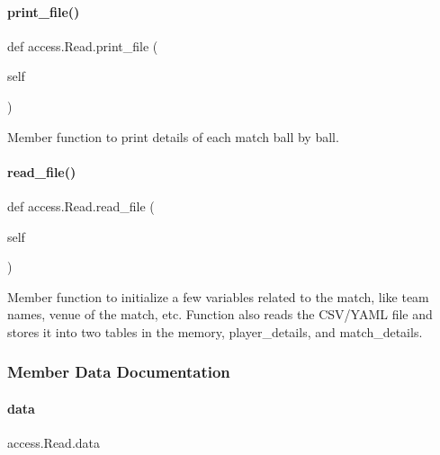 \paragraph{\texorpdfstring{print\+\_\+file()}{print\_file()}}
{\footnotesize\ttfamily def access.\+Read.\+print\+\_\+file (\begin{DoxyParamCaption}\item[{}]{self }\end{DoxyParamCaption})}

\begin{DoxyVerb}Member function to print details of each match ball by ball.
\end{DoxyVerb}
 \mbox{\label{classaccess_1_1Read_aeaf32257315cd5e6b99ce4bfef2d0bdb}} 
\paragraph{\texorpdfstring{read\+\_\+file()}{read\_file()}}
{\footnotesize\ttfamily def access.\+Read.\+read\+\_\+file (\begin{DoxyParamCaption}\item[{}]{self }\end{DoxyParamCaption})}

\begin{DoxyVerb}Member function to initialize a few variables related to the match, like team names, venue of the match, etc.
Function also reads the CSV/YAML file and stores it into two tables in the memory, player_details, and match_details.
\end{DoxyVerb}
 

\subsubsection{Member Data Documentation}
\mbox{\label{classaccess_1_1Read_a5a7dbfc250ef34435c08e175135c7c90}} 
\paragraph{\texorpdfstring{data}{data}}
{\footnotesize\ttfamily access.\+Read.\+data}



